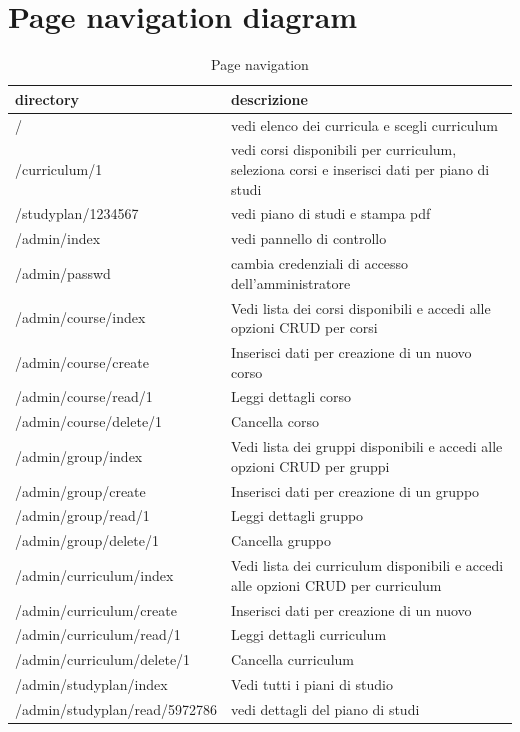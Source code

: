\documentclass{article}
\begin{document}
\section{Page navigation diagram}
\begin{table}[!h]
  \begin{center}
    \caption{Page navigation}
    \label{tab:Page navigation}
    \begin{tabular}{l|l} %
      \textbf{directory} & \textbf{descrizione}  \\ 
      \hline
		/ & vedi elenco dei curricula e scegli curriculum\\
		/curriculum/1 & vedi corsi disponibili per curriculum, seleziona corsi e  inserisci dati per piano di studi\\
		/studyplan/1234567  & vedi piano di studi e stampa pdf \\
		/admin/index & vedi pannello di controllo \\
		/admin/passwd  & cambia credenziali di accesso dell'amministratore\\
		/admin/course/index & Vedi lista dei corsi disponibili e accedi alle opzioni CRUD per corsi \\
		/admin/course/create & Inserisci dati per creazione di un nuovo corso \\
		/admin/course/read/1 & Leggi dettagli corso \\
		/admin/course/delete/1 & Cancella corso \\
		/admin/group/index & Vedi lista dei gruppi disponibili e accedi alle opzioni CRUD per gruppi \\
		/admin/group/create &  Inserisci dati per creazione di un gruppo \\
		/admin/group/read/1 & Leggi dettagli gruppo \\
		/admin/group/delete/1 & Cancella gruppo \\
		/admin/curriculum/index & Vedi lista dei curriculum disponibili e accedi alle opzioni CRUD per curriculum \\
		/admin/curriculum/create &  Inserisci dati per creazione di un nuovo \\
		/admin/curriculum/read/1 & Leggi dettagli curriculum \\
		/admin/curriculum/delete/1 & Cancella curriculum \\
		/admin/studyplan/index & Vedi tutti i piani di studio \\
		/admin/studyplan/read/5972786 & vedi dettagli del piano di studi \\
		
    \end{tabular}
  \end{center}
\end{table}
\end{document}
